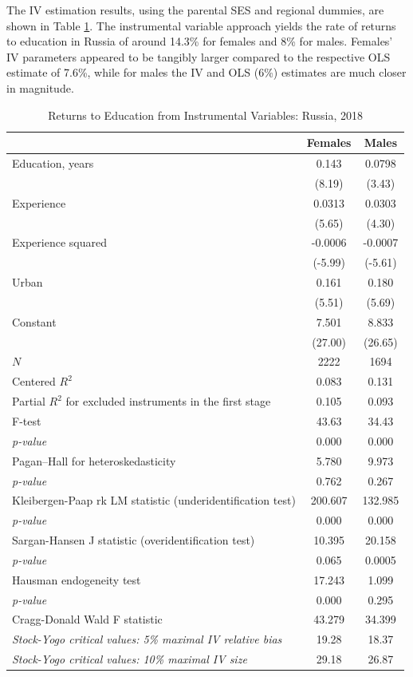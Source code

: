 \documentclass[alpha-refs]{wiley-article-01g}
\begin{document}
The IV estimation results, using the parental SES and regional dummies, are shown in Table \ref{tab:6.2}. The instrumental variable approach yields the rate of returns to education in Russia of around 14.3\% for females and 8\% for males. Females' IV parameters appeared to be tangibly larger compared to the respective OLS estimate of 7.6\%, while for males the IV and OLS (6\%) estimates are much closer in magnitude.

\begin{table}[h!]\centering
	\caption{Returns to Education from Instrumental Variables: Russia, 2018}
	\label{tab:6.2}
	\begin{tabular}{l*{2}{c}}
		\hline\hline
		&\multicolumn{1}{c}{Females}&\multicolumn{1}{c}{Males}\\
		\hline
		Education, years   &    0.143&   0.0798\\
		&   (8.19)&   (3.43)\\
		Experience     &   0.0313&   0.0303\\
		&   (5.65)&   (4.30)\\
		Experience squared    &-0.0006 &-0.0007\\
		&  (-5.99)&  (-5.61)\\
		Urban     &    0.161&    0.180\\
		&   (5.51)&   (5.69)\\
		Constant    &    7.501&    8.833\\
		&  (27.00)&  (26.65)\\
		\hline
		\(N\)     &     2222 &     1694\\
		Centered $R^2$  & 0.083   & 0.131 \\
		Partial $R^2$ for excluded instruments in the first stage   & 0.105   &  0.093 \\
		F-test  &  43.63  &  34.43 \\
		\textit{p-value}  &  0.000  & 0.000 \\
		Pagan–Hall for heteroskedasticity  &  5.780   & 9.973 \\
		\textit{p-value}  & 0.762  & 0.267 \\
		Kleibergen-Paap rk LM statistic (underidentification test)  &  200.607  & 132.985 \\
		\textit{p-value}  &  0.000  & 0.000 \\
		Sargan-Hansen J statistic (overidentification test)  & 10.395   & 20.158 \\
		\textit{p-value}  & 0.065   & 0.0005 \\
		Hausman endogeneity test  & 17.243   & 1.099 \\
		\textit{p-value}  & 0.000   & 0.295 \\
		Cragg-Donald Wald F statistic  & 43.279   & 34.399 \\
		\textit{Stock-Yogo critical values: 5\% maximal IV relative bias}  & 19.28   & 18.37 \\
		\textit{Stock-Yogo critical values: 10\% maximal IV size}  & 29.18   & 26.87 \\
		

\end{tabular}
\end{table}
\end{document}
